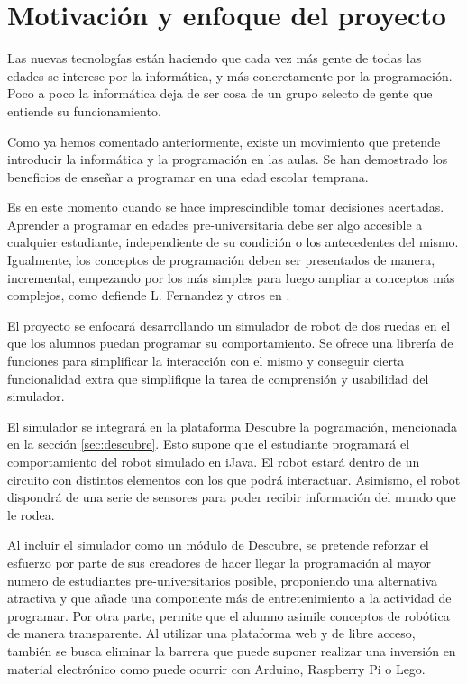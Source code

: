 \section{Motivación y enfoque del proyecto}
\label{sec:motivacion}

Las nuevas tecnologías están haciendo que cada vez más gente de todas las edades se interese por la informática, y más concretamente por la programación. Poco a poco la informática deja de ser cosa de un grupo selecto de gente que entiende su funcionamiento.

Como ya hemos comentado anteriormente, existe un movimiento que pretende introducir la informática y la programación en las aulas. Se han demostrado los beneficios de enseñar a programar en una edad escolar temprana.

Es en este momento cuando se hace imprescindible tomar decisiones acertadas. Aprender a programar en edades pre-universitaria debe ser algo accesible a cualquier estudiante, independiente de su condición o los antecedentes del mismo. Igualmente, los conceptos de programación deben ser presentados de manera, incremental, empezando por los más simples para luego ampliar a conceptos más complejos, como defiende L. Fernandez y otros en \cite{fernandez2002analisis}.

El proyecto se enfocará desarrollando un simulador de robot de dos ruedas en el que los alumnos puedan programar su comportamiento. Se ofrece una librería de funciones para simplificar la interacción con el mismo y conseguir cierta funcionalidad extra que simplifique la tarea de comprensión y usabilidad del simulador.

El simulador se integrará en la plataforma Descubre la pogramación, mencionada en la sección \ref{sec:descubre}. Esto supone que el estudiante programará el comportamiento del robot simulado en iJava. El robot estará dentro de un circuito con distintos elementos con los que podrá interactuar. Asimismo, el robot dispondrá de una serie de sensores para poder recibir información del mundo que le rodea.

Al incluir el simulador como un módulo de Descubre, se pretende reforzar el esfuerzo por parte de sus creadores de hacer llegar la programación al mayor numero de estudiantes pre-universitarios posible, proponiendo una alternativa atractiva y que añade una componente más de entretenimiento a la actividad de programar. Por otra parte, permite que el alumno asimile conceptos de robótica de manera transparente. Al utilizar una plataforma web y de libre acceso, también se busca eliminar la barrera que puede suponer realizar una inversión en material electrónico como puede ocurrir con Arduino, Raspberry Pi o Lego.


